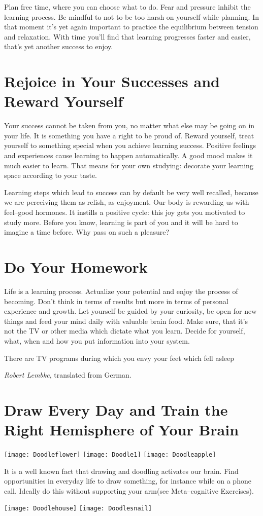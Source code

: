 \documentclass[../main.tex]{subfiles}
\begin{document}
 Plan {free time}, where you can choose what to do. {Fear and pressure inhibit the learning process}. Be mindful to not to be too harsh on yourself while planning. In that moment it's yet again important to practice the equilibrium between tension and relaxation. With time you'll find that learning progresses faster and easier, that's yet another success to enjoy.

 \section{Rejoice in Your Successes and Reward Yourself}
 
{Your success cannot be taken from you, no matter what else may be going on in your life.}
It is something you have a right to be proud of. 
 Reward yourself, treat yourself to {something special} when you achieve learning success.
 {Positive feelings and experiences} cause learning to happen automatically.
 A {good mood} makes it much easier to learn. 
That means for your own studying: {decorate your learning space according to your taste.}

Learning steps which lead to success can by default be very well recalled, because we are perceiving them as relish, as enjoyment. Our body is rewarding us with feel--good hormones. It instills a positive cycle: this joy gets you motivated to study more. Before you know, learning is part of you and it will be hard to imagine a time before. Why pass on such a pleasure?

\section{Do Your Homework}

{Life is a learning process}.
{Actualize your potential} and enjoy the process of becoming. 
Don't think in terms of results but more in terms of {personal experience} and {growth}.
Let yourself be guided by your {curiosity}, be {open for new things} and {feed your mind} daily with valuable brain food. 
Make sure, that it's not the TV or other media which dictate what you learn. {Decide for yourself}, what, when and how you put information into your system.

\epigraph{There are TV programs during which you envy your feet which fell asleep}{\textit{Robert Lembke}, translated from German.}

\section{Draw Every Day and Train the Right Hemisphere of Your Brain}


\texttt{[image: Doodleflower]}
\texttt{[image: Doodle1]}
\texttt{[image: Doodleapple]}


{It is a well known fact that {drawing} and doodling activates our brain.
  Find opportunities in everyday life to draw something, for instance while on a phone call.  
Ideally do this without supporting your arm}{(see Meta--cognitive Exercises)}.


\texttt{[image: Doodlehouse]}
\texttt{[image: Doodlesnail]}
\end{document}
